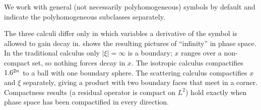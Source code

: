 We work with general (not necessarily polyhomogeneous) symbols by default
and indicate the polyhomogeneous subclasses separately.

\begin{discussion}
The three calculi differ only in which variables a derivative of the symbol
is allowed to gain decay in.  shows
the resulting pictures of ``infinity'' in phase space. In the traditional
calculus only $|\xi|=\infty$ is a boundary; $x$ ranges over a non-compact
set, so nothing forces decay in $x$. The isotropic calculus compactifies
$1.6^{2n}$ to a ball with one boundary sphere. The scattering calculus
compactifies $x$ and $\xi$ separately, giving a product with two boundary
faces that meet in a corner. Compactness results (a residual operator is
compact on $L^2$) hold exactly when phase space has been compactified in
every direction.
\end{discussion}

